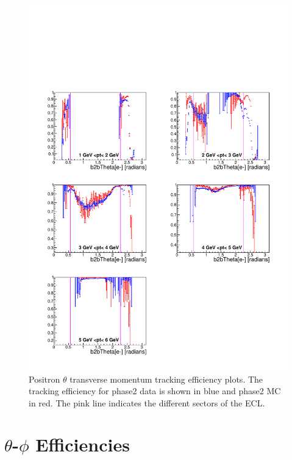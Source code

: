 \documentclass[a4paper,11pt,twosided,final,german,openbib,pdftex,listof=totoc,bibliography=totoc]{scrbook}
\begin{document}
\begin{figure}[!htbp]
	\centering
	\includegraphics[width=\textwidth]{Plots/master/xPtMThetaep}
	\caption[Transverse Momentum $\theta$ Positron Efficiency Phase2]{Positron $\theta$ transverse momentum tracking efficiency plots. The tracking efficiency for phase2 data is shown in blue and phase2 MC in red. The pink line indicates the different sectors of the ECL.}
	\label{plt:xPtMThetaep}
\end{figure}

\newpage

\section{$\theta$-$\phi$ Efficiencies}
\end{document}
